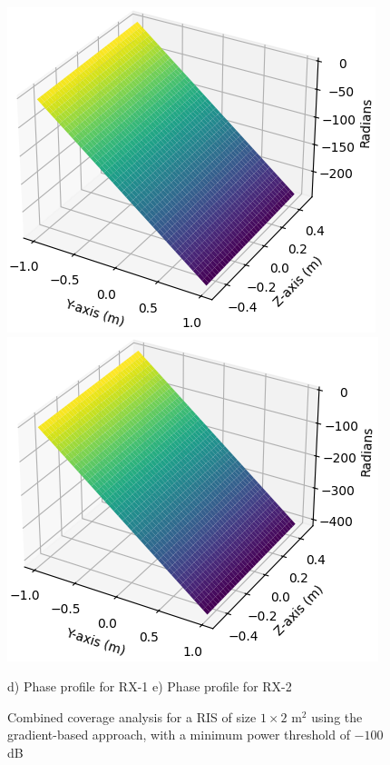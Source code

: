 \documentclass{IEEEoj}
\begin{document}
\begin{figure}
	\includegraphics[width=0.48\linewidth]{Sim_Results/pp_-100dB_gradient_RX1.png}
	\hfill
	\includegraphics[width=0.48\linewidth]{Sim_Results/pp_-100dB_gradient_RX2.png}
	
	\hspace{10pt} d) Phase profile for RX-1 \hspace{15pt} e) Phase profile for RX-2
	\caption{Combined coverage analysis for a RIS of size $1 \times 2$ m$^2$ using the gradient-based approach, with a minimum power threshold of $-100$ dB}
	\label{comb_cov_gradient}
\end{figure}
\end{document}
